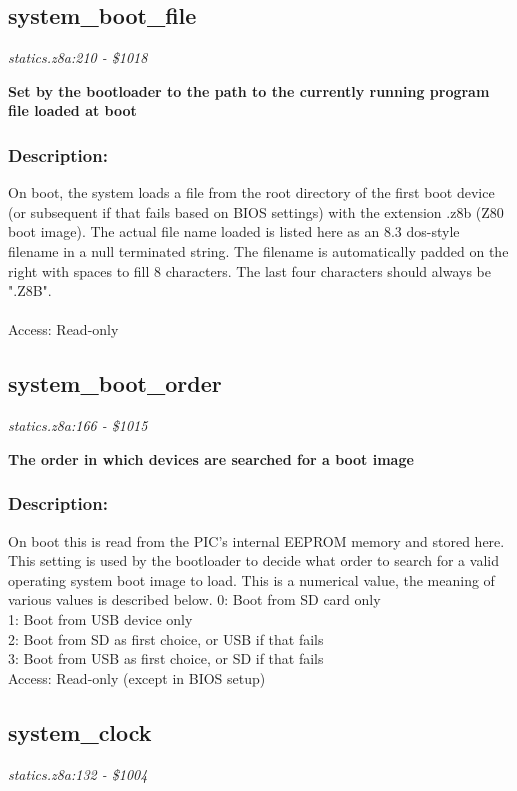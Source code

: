 \subsection{system\_boot\_file}
\textit{statics.z8a:210 - \$1018}

\noindent
\textbf{Set by the bootloader to the path to the currently running program file loaded at boot}

\subsubsection{Description:}
 On boot, the system loads a file from the root directory of the first boot device (or subsequent if that fails based on BIOS settings) with the extension .z8b (Z80 boot image).  The actual file name loaded is listed here as an 8.3 dos-style filename in a null terminated string.  The filename is automatically padded on the right with spaces to fill 8 characters.  The last four characters should always be ".Z8B".\\\\ Access: Read-only

\subsection{system\_boot\_order}
\textit{statics.z8a:166 - \$1015}

\noindent
\textbf{The order in which devices are searched for a boot image}

\subsubsection{Description:}
 On boot this is read from the PIC's internal EEPROM memory and stored here. This setting is used by the bootloader to decide what order to search for a valid operating system boot image to load.  This is a numerical value, the meaning of various values is described below. 0: Boot from SD card only\\ 1: Boot from USB device only\\ 2: Boot from SD as first choice, or USB if that fails\\ 3: Boot from USB as first choice, or SD if that fails\\ Access: Read-only (except in BIOS setup)

\subsection{system\_clock}
\textit{statics.z8a:132 - \$1004}

